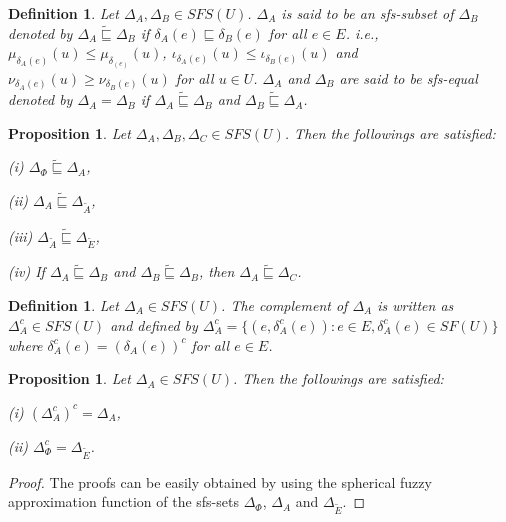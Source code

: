 \documentclass{IJFS}
\newtheorem{proposition}[theorem]{Proposition}
\newtheorem{definition}[theorem]{Definition}
\begin{document}
\begin{definition} Let $\Delta_A, \Delta_B \in SFS(U)$. $\Delta_A$
is said to be an sfs-subset of $\Delta_B$ denoted by $\Delta_A
\widetilde{\sqsubseteq} \Delta_B$ if $\delta_A(e) \sqsubseteq
\delta_B(e)$ for all $e\in E$. i.e., $\mu_{\delta_A(e)}(u)\le
\mu_{\delta_(e)}(u)$, $\iota_{\delta_A(e)}(u)\le
\iota_{\delta_B(e)}(u)$ and $\nu_{\delta_A(e)}(u)\ge
\nu_{\delta_B(e)}(u)$ for all $u\in U$.
 $\Delta_A$ and $\Delta_B$ are said
to be sfs-equal denoted by $\Delta_A=\Delta_B$ if $\Delta_A
\widetilde{\sqsubseteq} \Delta_B$ and $\Delta_B
\widetilde{\sqsubseteq} \Delta_A$.
\end{definition}

\begin{proposition} Let $\Delta_A, \Delta_B, \Delta_C \in SFS(U)$. Then
the followings are satisfied:


(i) $\Delta_\Phi \widetilde{\sqsubseteq} \Delta_A$,

(ii) $\Delta_A \widetilde{\sqsubseteq} \Delta_{\widetilde{A}}$,

(iii) $\Delta_{\widetilde{A}} \widetilde{\sqsubseteq}
\Delta_{\widetilde{E}}$,

(iv) If $\Delta_A \widetilde{\sqsubseteq} \Delta_B$ and $\Delta_B
\widetilde{\sqsubseteq} \Delta_B$, then $\Delta_A
\widetilde{\sqsubseteq} \Delta_C$.
\end{proposition}


\begin{definition} \label{c} Let $\Delta_A\in SFS(U)$. The  complement of
$\Delta_A$ is written as  $\Delta_A^c\in SFS(U)$ and defined by \linebreak[4]
$\Delta_A^c=\{(e,\delta_A^c(e)):e\in E, \delta_A^c(e)\in SF(U)\}$
where  $\delta_A^c(e)=(\delta_A(e))^c$ for all $e\in E$.
\end{definition}

\begin{proposition} Let $\Delta_A\in SFS(U)$. Then the followings are
satisfied:

(i) $(\Delta_A^c)^c=\Delta_A$,

(ii) $\Delta_\Phi^c=\Delta_{\widetilde{E}}$.
\end{proposition}

\begin{proof}
The proofs can be easily obtained by using the
spherical fuzzy approximation function of the sfs-sets
$\Delta_\Phi$, $\Delta_A$ and $\Delta_{\widetilde{E}}$.
\end{proof} 
\end{document}

